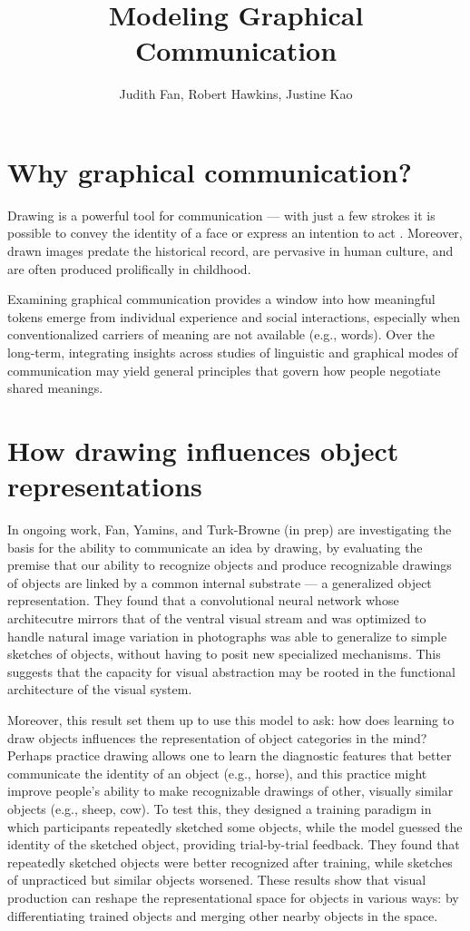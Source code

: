 \documentclass[12pt]{article}
\title{\textbf{Modeling Graphical Communication}}
\author{Judith Fan, Robert Hawkins, Justine Kao}
\begin{document}
\maketitle %

\section{Why graphical communication?}

Drawing is a powerful tool for communication --- with just a few strokes it is possible to convey the identity of a face \cite{bergmann2013impact} or express an intention to act \cite{Galantucci:2005uh}. Moreover, drawn images predate the historical record, are pervasive in human culture, and are often produced prolifically in childhood.

Examining graphical communication provides a window into how meaningful tokens emerge from individual experience and social interactions, especially when conventionalized carriers of meaning are not available (e.g., words). Over the long-term, integrating insights across studies of linguistic and graphical modes of communication may yield general principles that govern how people negotiate shared meanings.  

\section{How drawing influences object representations}

In ongoing work, Fan, Yamins, and Turk-Browne (in prep) are investigating the basis for the ability to communicate an idea by drawing, by evaluating the premise that our ability to recognize objects and produce recognizable drawings of objects are linked by a common internal substrate --- a generalized object representation. They found that a convolutional neural network whose architecutre mirrors that of the ventral visual stream and was optimized to handle natural image variation in photographs \cite{Yamins:2014gia} was able to generalize to simple sketches of objects, without having to posit new specialized mechanisms. This suggests that the capacity for visual abstraction may be rooted in the functional architecture of the visual system.

Moreover, this result set them up to use this model to ask: how does learning to draw objects influences the representation of object categories in the mind? Perhaps practice drawing allows one to learn the diagnostic features that better communicate the identity of an object (e.g., horse), and this practice might improve people's ability to make recognizable drawings of other, visually similar objects (e.g., sheep, cow). To test this, they designed a training paradigm in which participants repeatedly sketched some objects, while the model guessed the identity of the sketched object, providing trial-by-trial feedback. They found that repeatedly sketched objects were better recognized after training, while sketches of unpracticed but similar objects worsened. These results show that visual production can reshape the representational space for objects in various ways: by differentiating trained objects and merging other nearby objects in the space.
\end{document}
